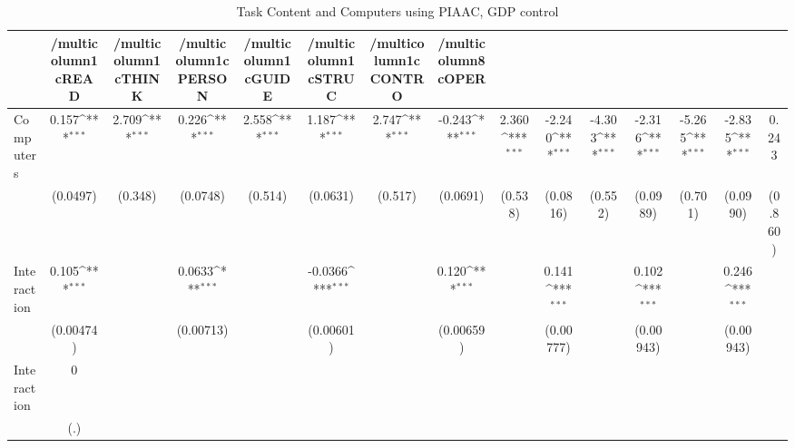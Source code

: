 \begin{table}[htbp]\centering
\def\sym#1{\ifmmode^{#1}\else\(^{#1}\)\fi}
\caption{Task Content and Computers using PIAAC, GDP control}
\begin{tabular}{l*{14}{c}}
\hline\hline
            &/multicolumn{1}{c}{READ}&/multicolumn{1}{c}{THINK}&/multicolumn{1}{c}{PERSON}&/multicolumn{1}{c}{GUIDE}&/multicolumn{1}{c}{STRUC}&/multicolumn{1}{c}{CONTRO}&/multicolumn{8}{c}{OPER}                                                                                                                                                       \\
\hline
Computers   &       0.157\sym{***}&       2.709\sym{***}&       0.226\sym{***}&       2.558\sym{***}&       1.187\sym{***}&       2.747\sym{***}&      -0.243\sym{***}&       2.360\sym{***}&      -2.240\sym{***}&      -4.303\sym{***}&      -2.316\sym{***}&      -5.265\sym{***}&      -2.835\sym{***}&       0.243         \\
            &    (0.0497)         &     (0.348)         &    (0.0748)         &     (0.514)         &    (0.0631)         &     (0.517)         &    (0.0691)         &     (0.538)         &    (0.0816)         &     (0.552)         &    (0.0989)         &     (0.701)         &    (0.0990)         &     (0.860)         \\
[1em]
Interaction &       0.105\sym{***}&                     &      0.0633\sym{***}&                     &     -0.0366\sym{***}&                     &       0.120\sym{***}&                     &       0.141\sym{***}&                     &       0.102\sym{***}&                     &       0.246\sym{***}&                     \\
            &   (0.00474)         &                     &   (0.00713)         &                     &   (0.00601)         &                     &   (0.00659)         &                     &   (0.00777)         &                     &   (0.00943)         &                     &   (0.00943)         &                     \\
[1em]
Interaction &           0         &                     &                     &                     &                     &                     &                     &                     &                     &                     &                     &                     &                     &                     \\
            &         (.)         &                     &                     &                     &                     &                     &                     &                     &                     &                     &                     &                     &                     &                     \\

\end{tabular}
\end{table}
